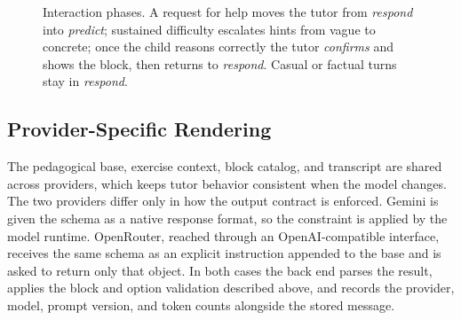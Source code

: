 \documentclass[conference]{IEEEtran}
\begin{document}
\begin{figure}[!t]
\centering
{}
\caption{Interaction phases. A request for help moves the tutor from \emph{respond} into \emph{predict}; sustained difficulty escalates hints from vague to concrete; once the child reasons correctly the tutor \emph{confirms} and shows the block, then returns to \emph{respond}. Casual or factual turns stay in \emph{respond}.}
\label{fig:phases}
\end{figure}

\subsection{Provider-Specific Rendering}

The pedagogical base, exercise context, block catalog, and transcript are shared across providers, which keeps tutor behavior consistent when the model changes. The two providers differ only in how the output contract is enforced. Gemini is given the schema as a native response format, so the constraint is applied by the model runtime. OpenRouter, reached through an OpenAI-compatible interface, receives the same schema as an explicit instruction appended to the base and is asked to return only that object. In both cases the back end parses the result, applies the block and option validation described above, and records the provider, model, prompt version, and token counts alongside the stored message.
\end{document}
